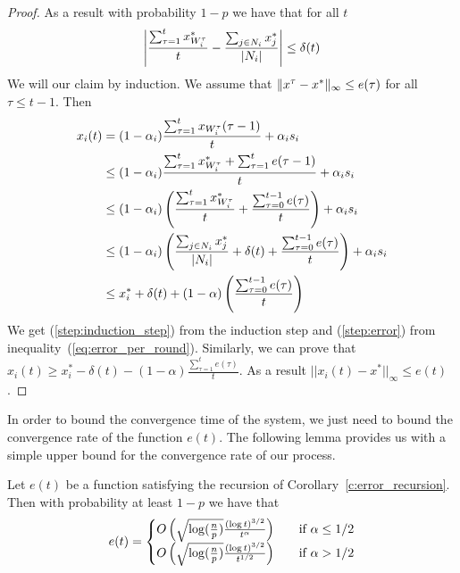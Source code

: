 \begin{proof}
  As a result with probability $1-p$ we have that for all $t$
  \begin{equation}\label{eq:error_per_round}
    \left|
    \frac{\sum_{\tau=1}^t x^*_{W_i^\tau}}{t} -
    \frac{\sum_{j \in N_i} x^*_j}{|N_i|}
    \right| \leq \delta(t)
  \end{equation}
  We will our claim by induction.
  We assume that $\| x^{\tau}-x^* \|_{\infty} \leq e(\tau)$ for all
  $\tau \leq t-1$. Then
  \begin{align}
    x_i(t)
    &=
    (1-\alpha_i)\frac{\sum_{\tau=1}^{t}x_{W_i^{\tau}}(\tau-1)}{t}
    + \alpha_i s_i \nonumber \\
    &\leq
    (1-\alpha_i)\frac{\sum_{\tau=1}^{t}x^*_{W_i^{\tau}} +
      \sum_{\tau=1}^{t} e(\tau-1)}{t} + \alpha_i s_i \label{step:induction_step}\\
    &\leq
    (1-\alpha_i)
    \left(
    \frac{\sum_{\tau=1}^{t}x^*_{W_i^{\tau}}}{t}+
    \frac{\sum_{\tau=0}^{t-1} e(\tau)}{t}
    \right)
    + \alpha_i s_i \nonumber\\
    &\leq
    (1-\alpha_i)\left(\frac{\sum_{j \in N_i}x^*_{j}}{|N_i|} +
    \delta(t) + \frac{\sum_{\tau=0}^{t-1} e(\tau)}{t} \right) +
    \alpha_i s_i \label{step:error} \\
    &\leq
    x_i^* + \delta(t) + (1-\alpha)
    \left(
    \frac{\sum_{\tau=0}^{t-1} e(\tau)}{t}
    \right)
    \nonumber
  \end{align}
  We get (\ref{step:induction_step}) from the induction step and
  (\ref{step:error}) from inequality~(\ref{eq:error_per_round}).
  Similarly, we can prove that
  $x_i(t) \geq x_i^* - \delta(t) - (1-\alpha)
  \frac{\sum_{\tau=1}^t e(\tau)}{t}$.
  As a result $||x_i(t)-x^*||_{\infty} \leq e(t)$.
\end{proof}

In order to bound the convergence time of the system, we just need to bound
the convergence rate of the function $e(t)$.
The following lemma provides us with a simple upper bound for the
convergence rate of our process.


\begin{lemma}\label{l:error_bound}
  Let $e(t)$ be a function satisfying the recursion of
  Corollary~\ref{c:error_recursion}. Then with probability
  at least $1-p$ we have that
  \[
    e(t) =
    \begin{cases}
      O\left(\sqrt{\log(\frac{n}{p})}\frac{(\log t)^{3/2}}{t^\alpha}\right)
      &\quad\text{if } \alpha \leq 1/2\\
      O\left(\sqrt{\log(\frac{n}{p})}\frac{(\log t)^{3/2}}{t^{1/2}}\right)
      &\quad\text{if } \alpha > 1/2\\
    \end{cases}
  \]
\end{lemma}

